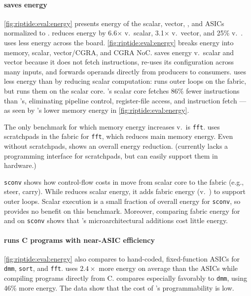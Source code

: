 \paragraph{\riptide saves energy}
\autoref{fig:riptide:eval:energy} presents energy of the scalar, vector, 
\snafu, and ASICs normalized to \riptide.
% 
\riptide reduces energy by 6.6$\times$ v.\ scalar, 3.1$\times$ v.\ vector, and 25\% v.\ \snafu.
%
\riptide uses less energy across the board.
% 
\autoref{fig:riptide:eval:energy} breaks energy into memory, scalar, vector/CGRA, and CGRA NoC.
% 
\riptide saves energy v.\ scalar and vector because it does not fetch instructions,
re-uses its configuration across many inputs, and forwards operands 
directly from producers to consumers.
% 
\riptide uses less energy than \snafu by reducing scalar computation:  \riptide runs
outer loops on the fabric, but \snafu runs them on the scalar core.
% 
\riptide's scalar core fetches 86\% fewer instructions than \snafu's,
eliminating pipeline control,
register-file access,
and instruction fetch ---
%
as seen by \riptide's lower memory energy in \autoref{fig:riptide:eval:energy}.

The only benchmark for which memory energy increases v.\ \snafu is {\tt fft}.
% 
\snafu uses scratchpads in the fabric for {\tt fft}, which reduces main memory energy.
% 
Even without scratchpads, \riptide shows an overall energy reduction.
(\riptide currently lacks a programming interface for scratchpads,
but can easily support them in hardware.)

{\tt sconv} shows how control-flow costs in \riptide move from scalar core to the
fabric (e.g., steer, carry).
% 
While \riptide reduces scalar energy, it adds fabric energy (v.\
\snafu) to support outer loops.
% 
Scalar execution is a small fraction of overall energy for {\tt sconv},
so \riptide provides no benefit on this benchmark.
%
Moreover, comparing fabric energy for \snafu and \riptide on {\tt sconv} shows that
\riptide's microarchitectural additions cost little energy.
% 

\paragraph{\riptide runs C programs with near-ASIC efficiency}
\autoref{fig:riptide:eval:energy} also compares \riptide to hand-coded, fixed-function
ASICs for {\tt dmm}, {\tt sort}, and {\tt fft}.
% 
\riptide uses $2.4\times$ more energy on average
than the ASICs while
compiling programs directly from C. %
% 
\riptide compares especially favorably to {\tt dmm}, using 46\% more energy.
% 
The data show that the cost of \riptide's programmability is low.

